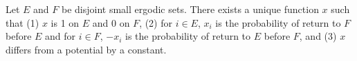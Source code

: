 Let $E$ and $F$ be disjoint small ergodic sets. There exists a unique function $x$ such that (1) $x$ is 1 on $E$ and 0 on $F$, (2) for $i \in E$, $x_i$ is the probability of return to $F$ before $E$ and for $i \in F$, $-x_i$ is the probability of return to $E$ before $F$, and (3) $x$ differs from a potential by a constant.
